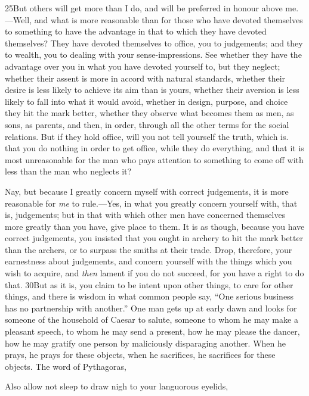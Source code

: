 25But others will get more than I do, and will be preferred in honour above me.—Well, and what is more reasonable than for those who have devoted themselves to something to have the advantage in that to which they have devoted themselves? They have devoted themselves to office, you to judgements; and they to wealth, you to dealing with your sense-impressions. See whether they have the advantage over you in what you have devoted yourself to, but they neglect; whether their assent is more in accord with natural standards, whether their desire is less likely to achieve its aim than is yours, whether their aversion is less likely to fall into what it would avoid, whether in design, purpose, and choice they hit the mark better, whether they observe what becomes them as men, as sons, as parents, and then, in order, through all the other terms for the social relations. But if they hold office, will you not tell yourself the truth, which is. that you do nothing in order to get office, while they do everything, and that it is most unreasonable for the man who pays attention to something to come off with less than the man who neglects it?

Nay, but because I greatly concern myself with correct judgements, it is more reasonable for \emph{me} to rule.—Yes, in what you greatly concern yourself with, that is, judgements; but in that with which other men have concerned themselves more greatly than you have, give place to them. It is as though, because you have correct judgements, you insisted that you ought in archery to hit the mark better than the archers, or to surpass the smiths at their trade. Drop, therefore, your earnestness about judgements, and concern yourself with the things which you wish to acquire, and \emph{then} lament if you do not succeed, for you have a right to do that. 30But as it is, you claim to be intent upon other things, to care for other things, and there is wisdom in what common people say, ``One serious business has no partnership with another.'' One man gets up at early dawn and looks for someone of the household of Caesar to salute, someone to whom he may make a pleasant speech, to whom he may send a present, how he may please the dancer, how he may gratify one person by maliciously disparaging another. When he prays, he prays for these objects, when he sacrifices, he sacrifices for these objects. The word of Pythagoras,

Also allow not sleep to draw nigh to your languorous eyelids,

